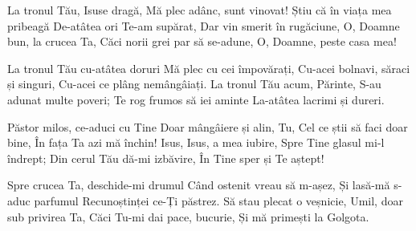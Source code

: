 \beginverse
La tronul Tău, Isuse dragă,
Mă plec adânc, sunt vinovat!
Știu că în viața mea pribeagă
De-atâtea ori Te-am supărat,
Dar vin smerit în rugăciune,
O, Doamne bun, la crucea Ta,
Căci norii grei par să se-adune,
O, Doamne, peste casa mea!
\endverse

\beginverse
La tronul Tău cu-atâtea doruri
Mă plec cu cei împovărați,
Cu-acei bolnavi, săraci și singuri,
Cu-acei ce plâng nemângâiați.
La tronul Tău acum, Părinte,
S-au adunat multe poveri;
Te rog frumos să iei aminte
La-atâtea lacrimi și dureri.
\endverse

\beginverse
Păstor milos, ce-aduci cu Tine
Doar mângâiere și alin,
Tu, Cel ce știi să faci doar bine,
În fața Ta azi mă închin!
Isus, Isus, a mea iubire,
Spre Tine glasul mi-l îndrept;
Din cerul Tău dă-mi izbăvire,
În Tine sper și Te aștept!
\endverse

\beginverse
Spre crucea Ta, deschide-mi drumul
Când ostenit vreau să m-așez,
Și lasă-mă s-aduc parfumul
Recunoștinței ce-Ți păstrez.
Să stau plecat o veșnicie,
Umil, doar sub privirea Ta,
Căci Tu-mi dai pace, bucurie,
Și mă primești la Golgota.
\endverse
\endsong